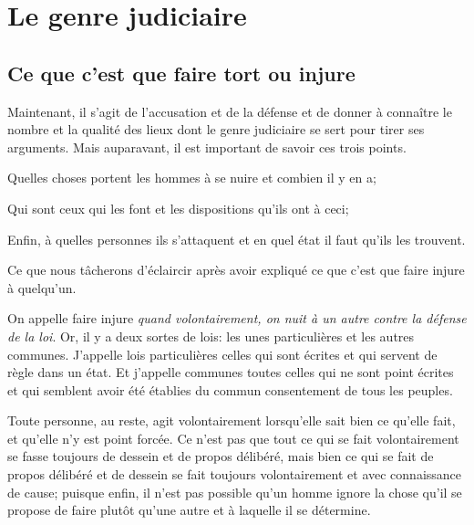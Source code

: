 
\chapter{Le genre judiciaire}
\section{Ce que c'est que faire tort ou injure}

Maintenant, il s'agit de l'accusation et de la défense et de donner à connaître le nombre et la qualité
des lieux dont le genre judiciaire se sert pour tirer ses arguments. Mais auparavant, il est important de
savoir ces trois points. 

\begin{emphpar}
	Quelles choses portent les hommes à se nuire et combien il y en a;

	Qui sont ceux qui les font et les dispositions qu'ils ont à ceci;

	Enfin, à quelles personnes ils s'attaquent et en quel état il faut qu'ils les trouvent.
\end{emphpar}

Ce que nous tâcherons d'éclaircir après avoir expliqué ce que c'est que faire injure à quelqu'un. 

On appelle faire injure \emph{quand volontairement, on nuit à un autre contre la défense de la loi}. Or,
il y a deux sortes de lois: les unes particulières et les autres communes. J'appelle lois particulières celles
qui sont écrites et qui servent de règle dans un état. Et j'appelle communes toutes celles qui ne sont point
écrites et qui semblent avoir été établies du commun consentement de tous les peuples.

Toute personne, au reste, agit volontairement lorsqu'elle sait bien ce qu'elle fait, et qu'elle n'y est point
forcée. Ce n'est pas que tout ce qui se fait volontairement se fasse toujours de dessein et de propos délibéré,
mais bien ce qui se fait de propos délibéré et de dessein se fait toujours volontairement et avec connaissance
de cause; puisque enfin, il n'est pas possible qu'un homme ignore la chose qu'il se propose de faire plutôt qu'une
autre et à laquelle il se détermine.

\bigbreak

